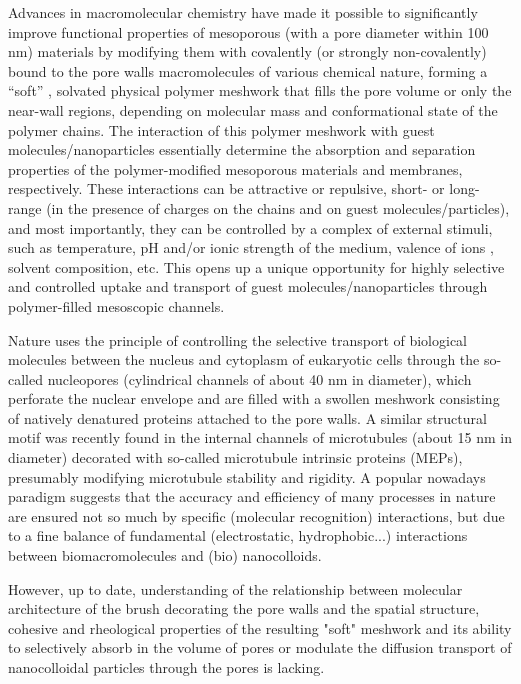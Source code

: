 \documentclass[12pt, a4paper]{article}
\begin{document}
Advances in macromolecular chemistry have made it possible to significantly improve functional properties of mesoporous (with a pore diameter within 100 nm) 
materials by modifying them with covalently (or strongly non-covalently) bound to the pore walls macromolecules of various chemical nature,  
forming a “soft” , solvated physical polymer meshwork that fills the pore volume or only the near-wall regions, 
depending on molecular mass and conformational state of the polymer chains. 
The interaction of this polymer meshwork with guest molecules/nanoparticles 
essentially determine the absorption and separation properties of the polymer-modified mesoporous materials and membranes, respectively. 
These interactions can be attractive or repulsive, short- or long-range (in the presence of charges on the chains and on guest molecules/particles), 
and most importantly, they can be controlled by a complex of external stimuli, such as temperature, pH and/or ionic strength of the medium, valence of ions , 
solvent composition, etc. This opens up a unique opportunity for highly selective and controlled uptake and transport of guest molecules/nanoparticles 
through polymer-filled mesoscopic channels. 

Nature uses the principle of controlling the selective transport of biological molecules 
between the nucleus and cytoplasm of eukaryotic cells through the so-called nucleopores (cylindrical channels of about 40 nm in diameter), 
which perforate the nuclear envelope and are filled with a swollen meshwork consisting of natively denatured proteins attached to the pore walls. 
A similar structural motif was recently found in the internal channels of microtubules (about 15 nm in diameter) 
decorated with so-called microtubule intrinsic proteins (MEPs), presumably modifying microtubule stability and rigidity.
A popular nowadays paradigm suggests that the accuracy and efficiency of many processes in nature are ensured 
not so much by specific (molecular recognition) interactions, but due to a fine balance of fundamental (electrostatic, hydrophobic...) 
interactions between biomacromolecules and (bio) nanocolloids.  

However, up to date, 
understanding of the relationship between molecular architecture of the brush 
decorating the pore walls and the spatial structure, 
cohesive and rheological properties of the resulting "soft" meshwork and its ability to selectively absorb in the 
volume of pores or modulate the diffusion transport of nanocolloidal particles through the pores is lacking. 
\end{document}
